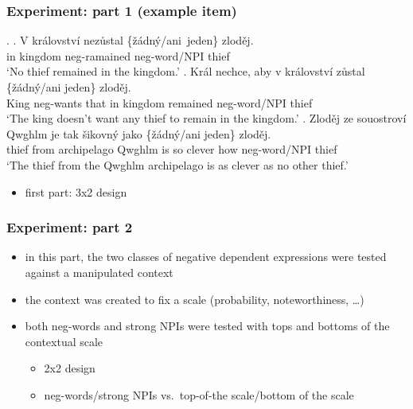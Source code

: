\documentclass[
  letterpaper,
  DIV=11,
  numbers=noendperiod]{scrartcl}
\providecommand{\tightlist}{%
  \setlength{\itemsep}{0pt}\setlength{\parskip}{0pt}}\usepackage{longtable,booktabs,array}
\begin{document}
\hypertarget{experiment-part-1-example-item}{%
\subsubsection{Experiment: part 1 (example
item)}\label{experiment-part-1-example-item}}

\ex. \ag. V království nezůstal \{žádný/ani~jeden\} zloděj.\\
in kingdom neg-ramained neg-word/NPI thief\\
`No thief remained in the kingdom.' \bg. Král nechce, aby v království
zůstal \{žádný/ani jeden\} zloděj.\\
King neg-wants that in kingdom remained neg-word/NPI thief\\
`The king doesn't want any thief to remain in the kingdom.' \cg. Zloděj
ze souostroví Qwghlm je tak šikovný jako \{žádný/ani jeden\} zloděj.\\
thief from archipelago Qwghlm is so clever how neg-word/NPI thief\\
`The thief from the Qwghlm archipelago is as clever as no other thief.'

\begin{itemize}
\tightlist
\item
  first part: 3x2 design
\end{itemize}

\hypertarget{experiment-part-2}{%
\subsubsection{Experiment: part 2}\label{experiment-part-2}}

\begin{itemize}
\tightlist
\item
  in this part, the two classes of negative dependent expressions were
  tested against a manipulated context
\item
  the context was created to fix a scale (probability, noteworthiness,
  \ldots)
\item
  both neg-words and strong NPIs were tested with tops and bottoms of
  the contextual scale

  \begin{itemize}
  \tightlist
  \item
    2x2 design
  \item
    neg-words/strong NPIs vs.~top-of-the scale/bottom of the scale
  \end{itemize}
\end{itemize}
\end{document}
